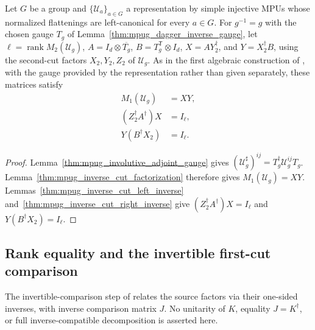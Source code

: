 \begin{lemma}
    \label{thm:mpug_involutive_first_cut}
    \leanok
    Let $G$ be a group and $\{\mathcal U_a\}_{a\in G}$ a representation
    by simple injective MPUs whose normalized flattenings are
    left-canonical for every $a\in G$. For $g^{-1}=g$ with the chosen gauge
    $T_g$ of Lemma~\ref{thm:mpug_dagger_inverse_gauge}, let
    $\ell=\operatorname{rank}M_2(\mathcal U_g)$,
    $A=I_d\otimes\overline{T_g}$, $B=T_g^{\mathsf T}\otimes I_d$,
    $X=AY_2^\dagger$, and $Y=X_2^\dagger B$, using the second-cut
    factors $X_2,Y_2,Z_2$ of $\mathcal U_g$. As in the first algebraic
    construction of \cite[lines~5390--5432]{FrancoRubio2025MPUGauging}, with
    the gauge provided by the representation rather than given separately,
    these matrices satisfy
    \begin{align}
        M_1(\mathcal U_g)        & =XY,     \\
        (Z_2^\dagger A^\dagger)X & =I_\ell, \\
        Y(B^\dagger X_2)         & =I_\ell.
    \end{align}
\end{lemma}
\begin{proof}\leanok
    Lemma~\ref{thm:mpug_involutive_adjoint_gauge} gives
    $(\mathcal U_g^\sharp)^{ij}=T_g^\dagger\mathcal U_g^{ij}T_g$.
    Lemma~\ref{thm:mpug_inverse_cut_factorization} therefore gives
    $M_1(\mathcal U_g)=XY$. Lemmas~\ref{thm:mpug_inverse_cut_left_inverse}
    and~\ref{thm:mpug_inverse_cut_right_inverse} give
    $(Z_2^\dagger A^\dagger)X=I_\ell$ and $Y(B^\dagger X_2)=I_\ell$.
\end{proof}

\subsection{Rank equality and the invertible first-cut comparison}

The invertible-comparison step of
\cite[lines~5432--5443]{FrancoRubio2025MPUGauging} relates the source factors
via their one-sided inverses, with inverse comparison matrix $J$.
No unitarity of $K$, equality $J=K^\dagger$, or full inverse-compatible
decomposition is asserted here.

